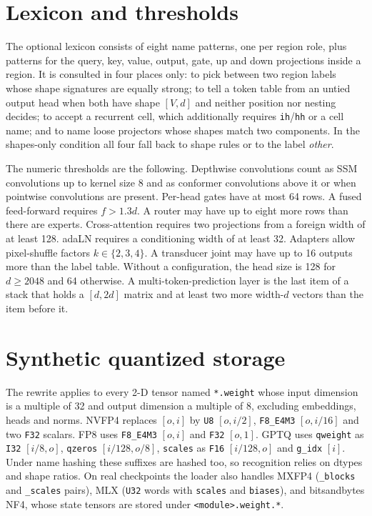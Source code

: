 \documentclass[11pt]{article}
\newcommand{\tn}[1]{\texttt{#1}}
\begin{document}
\section{Lexicon and thresholds}
\label{app:rules}
The optional lexicon consists of eight name patterns, one per region role, plus patterns for the query, key, value, output, gate, up and down projections inside a region. It is consulted in four places only: to pick between two region labels whose shape signatures are equally strong; to tell a token table from an untied output head when both have shape $[V,d]$ and neither position nor nesting decides; to accept a recurrent cell, which additionally requires \tn{ih}/\tn{hh} or a cell name; and to name loose projectors whose shapes match two components. In the shapes-only condition all four fall back to shape rules or to the label \emph{other}.

The numeric thresholds are the following. Depthwise convolutions count as SSM convolutions up to kernel size 8 and as conformer convolutions above it or when pointwise convolutions are present. Per-head gates have at most 64 rows. A fused feed-forward requires $f>1.3d$. A router may have up to eight more rows than there are experts. Cross-attention requires two projections from a foreign width of at least 128. adaLN requires a conditioning width of at least 32. Adapters allow pixel-shuffle factors $k\in\{2,3,4\}$. A transducer joint may have up to 16 outputs more than the label table. Without a configuration, the head size is 128 for $d\ge2048$ and 64 otherwise. A multi-token-prediction layer is the last item of a stack that holds a $[d,2d]$ matrix and at least two more width-$d$ vectors than the item before it.

\section{Synthetic quantized storage}
\label{app:quant}
The rewrite applies to every 2-D tensor named \tn{*.weight} whose input dimension is a multiple of 32 and output dimension a multiple of 8, excluding embeddings, heads and norms. NVFP4 replaces $[o,i]$ by \tn{U8} $[o,i/2]$, \tn{F8\_E4M3} $[o,i/16]$ and two \tn{F32} scalars. FP8 uses \tn{F8\_E4M3} $[o,i]$ and \tn{F32} $[o,1]$. GPTQ uses \tn{qweight} as \tn{I32} $[i/8,o]$, \tn{qzeros} $[i/128,o/8]$, \tn{scales} as \tn{F16} $[i/128,o]$ and \tn{g\_idx} $[i]$. Under name hashing these suffixes are hashed too, so recognition relies on dtypes and shape ratios. On real checkpoints the loader also handles MXFP4 (\tn{\_blocks} and \tn{\_scales} pairs), MLX (\tn{U32} words with \tn{scales} and \tn{biases}), and bitsandbytes NF4, whose state tensors are stored under \tn{<module>.weight.*}.
\end{document}
